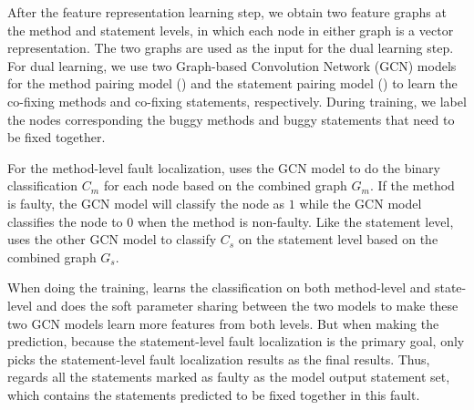 After the feature representation learning step, we obtain two feature
graphs at the method and statement levels, in which each node in
either graph is a vector representation. The two graphs are used as
the input for the dual learning step. For dual learning, we use two
Graph-based Convolution Network (GCN) models~\cite{kipf2016semi} for
the method pairing model () and the statement pairing
model () to learn the co-fixing methods and co-fixing
statements, respectively. During training, we label the nodes
corresponding the buggy methods and buggy statements that
need to be fixed together.

For the method-level fault localization, \tool uses the GCN model \cite{kipf2016semi} to do the binary classification $C_m$ for each node based on the combined graph $G_m$. If the method is faulty, the GCN model will classify the node as $1$ while the GCN model classifies the node to $0$ when the method is non-faulty. Like the statement level, \tool uses the other GCN model to classify $C_s$ on the statement level based on the combined graph $G_s$.

When doing the training, \tool learns the classification on both method-level and state-level and does the soft parameter sharing between the two models to make these two GCN models learn more features from both levels. But when making the prediction, because the statement-level fault localization is the primary goal, \tool only picks the statement-level fault localization results as the final results. Thus, \tool regards all the statements marked as faulty as the model output statement set, which contains the statements predicted to be fixed together in this fault.
